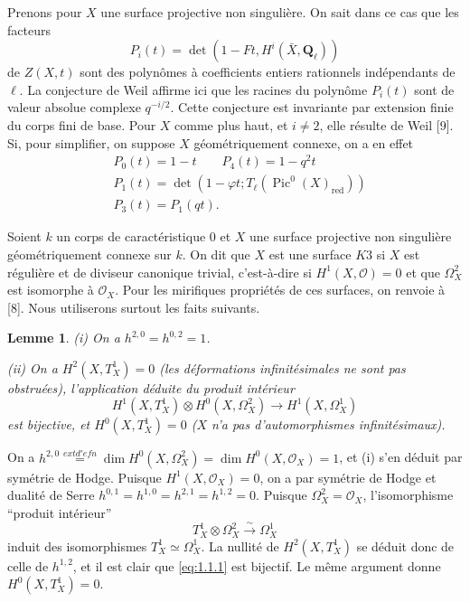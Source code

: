 \documentclass[11pt]{amsart}
\theoremstyle{plain}
\newtheorem{lemme}[theoreme]{Lemme}
\theoremstyle{definition}
\theoremstyle{remark}
\begin{document}
Prenons pour $X$ une surface projective non singuli\`ere. On sait dans ce cas que les facteurs
\begin{equation*}
P_i(t)=\det(1-Ft,H^i(\bar{X},\mathbf{Q}_\ell))
\end{equation*}
de $Z(X,t)$ sont des polyn\^omes \`a coefficients entiers rationnels ind\'ependants de $\ell$. La conjecture de Weil affirme ici que les racines du polyn\^ome $P_i(t)$ sont de valeur absolue complexe $q^{-i/2}$. Cette conjecture est invariante par extension finie du corps fini de base. Pour $X$ comme plus haut, et $i\neq 2$, elle r\'esulte de Weil [9]. Si, pour simplifier, on suppose $X$ g\'eom\'etriquement connexe, on a en effet
\begin{align*}
&P_0(t)=1-t \qquad P_4(t)=1-q^2t \\
&P_1(t)=\det(1-\varphi t;T_\ell(\operatorname{Pic}^0(X)_{\mathrm{red}})) \\
&P_3(t)=P_1(qt).
\end{align*}

Soient $k$ un corps de caract\'eristique $0$ et $X$ une surface projective non singuli\`ere g\'eom\'etriquement connexe sur $k$. On dit que $X$ est une surface $K3$ si $X$ est r\'eguli\`ere et de diviseur canonique trivial, c'est-\`a-dire si $H^1(X,\mathcal{O})=0$ et que $\Omega_X^2$ est isomorphe \`a $\mathcal{O}_X$. Pour les mirifiques propri\'et\'es de ces surfaces, on renvoie \`a [8]. Nous utiliserons surtout les faits suivants.

\begin{lemme}
\textup{(i)} On a $h^{2,0}=h^{0,2}=1$.

\textup{(ii)} On a $H^2(X,T_X^1)=0$ (les d\'eformations infinit\'esimales ne sont pas obstru\'ees), l'application d\'eduite du produit int\'erieur
\begin{equation}\label{eq:1.1.1}
H^1(X,T_X^1)\otimes H^0(X,\Omega_X^2)\longrightarrow H^1(X,\Omega_X^1)
\end{equation}
est bijective, et $H^0(X,T_X^1)=0$ ($X$ n'a pas d'automorphismes infinit\'esimaux).
\end{lemme}

On a $h^{2,0}\overset{	ext{d'efn}}{=}\dim H^0(X,\Omega_X^2)=\dim H^0(X,\mathcal{O}_X)=1$, et \textup{(i)} s'en d\'eduit par sym\'etrie de Hodge. Puisque $H^1(X,\mathcal{O}_X)=0$, on a par sym\'etrie de Hodge et dualit\'e de Serre $h^{0,1}=h^{1,0}=h^{2,1}=h^{1,2}=0$. Puisque $\Omega_X^2=\mathcal{O}_X$, l'isomorphisme ``produit int\'erieur''
\begin{equation*}
T_X^1\otimes\Omega_X^2\xrightarrow{\sim}\Omega_X^1
\end{equation*}
induit des isomorphismes $T_X^1\simeq\Omega_X^1$. La nullit\'e de $H^2(X,T_X^1)$ se d\'eduit donc de celle de $h^{1,2}$, et il est clair que \eqref{eq:1.1.1} est bijectif. Le m\^eme argument donne $H^0(X,T_X^1)=0$.
\end{document}
